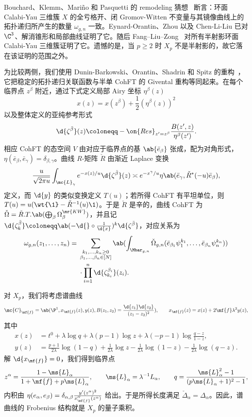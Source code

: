Bouchard、Klemm、Mari\~{n}o 和 Pasquetti 的 remodeling 猜想~\cite{BKMP2009} 断言：环面 Calabi-Yau 三维簇 \(X\) 的全亏格开、闭 Gromov-Witten 不变量与其镜像曲线上的拓扑递归所产生的数量 \(\omega_{g,n}\) 一致。Eynard-Orantin、Zhou 以及 Chen-Li-Liu 已对 \(\C^3\)、解消锥形和局部曲线证明了它。随后 Fang--Liu--Zong~\cite{FLZ2020} 对所有半射影环面 Calabi-Yau 三维簇证明了它。遗憾的是，当 \(p \geq 2\) 时 \(X_p\) 不是半射影的，故它落在该证明的范围之外。

为比较两侧，我们使用 Dunin-Barkowski、Orantin、Shadrin 和 Spitz 的重构~\cite{DOSS2014}，它把稳定的拓扑递归关联函数与半单 CohFT 的 Givental 重构等同起来。在每个临界点 \(z^{\beta}\) 附近，通过下式定义局部 Airy 坐标 \(\eta^{\beta}(z)\)
\[ x(z) = x(z^{\beta}) + \frac{1}{2}(\eta^{\beta}(z))^2 \]
以及整体定义的亚纯参考形式
\[ \d{\zeta^{\bar{\beta}}}(z) \coloneqq -\on{Res}_{z'=z^{\beta}}\frac{B(z',z)}{\eta^{\beta}(z')}. \]
相应 CohFT 的态空间 \(V\) 由对应于临界点的基 \(\ab\{\bar{e}_{\beta}\}\) 张成，配为对角形式，\(\eta(\bar{e}_{\beta},\bar{e}_{\gamma}) = \delta_{\beta,\gamma}\)。曲线 \(R\)-矩阵 \(\check{R}\) 由渐近 Laplace 变换
\[ \frac{u}{\sqrt{2\pi u}}\int_{\mc{L}_{\gamma}} e^{-x(z)/u}\d{\zeta^{\bar{\beta}}}(z) \asymp e^{-x^{\gamma}/u}\eta\ab(\bar{e}_{\gamma}, \check{R}^*(-u)\bar{e}_{\beta}), \]
定义，而 \(\d{y}\) 的类似变换定义 \(T(u)\)；若所得 CohFT 有平坦单位，则 \(T(u) = u(\wt{\1}-\check{R}^{-1}(u)\1)\)。于是 \(\check{R}\) 是辛的，曲线 CohFT 为 \(\check{\Omega} = \check{R}.T.\ab(\bigoplus_{\beta}\Omega^{\mr{KW}}_{\beta})\)，并且记 \(\d{\zeta^{\bar{\beta}}_k} \coloneqq \ab(-\d{} \circ \frac{1}{\d{x}})^k \d{\zeta^{\bar{\beta}}}\)，对应关系为
\begin{align*}
    \omega_{g,n}(z_1,\ldots,z_n) ={}& \sum_{\substack{k_1,\ldots,k_n \geq 0 \\ \beta_1,\ldots,\beta_n \in [N]}}\ab(\int_{\Mbar_{g,n}} \check{\Omega}_{g,n}(\bar{e}_{\beta_1}\psi_1^{k_1},\ldots,\bar{e}_{\beta_n}\psi_n^{k_n})) \\
    &\cdot \prod_{i=1}^n \d{\zeta^{\beta_i}_{k_i}}(z_i).
\end{align*}

对 \(X_p\)，我们将考虑谱曲线
\[ \mc{C}_{\mf{f}} = \ab(\P^1, x_{\mf{f}}(z), y(z), B(z_1,z_2) = \frac{\d{z_1}\d{z_2}}{(z_1-z_2)^2}), \qquad x_{\mf{f}}(z) = x(z) + 2\mf{f}\lambda^2 y(z), \]
其中
\begin{align*}
    x(z) &= t^0 + \lambda \log q + \lambda(p-1)\log z + \lambda(-p-1)\log\frac{q-z}{1-z}, \\
    y(z) &= \frac{p+1}{2\lambda}\log(1-q) + \frac{1}{2\lambda}\log z - \frac{1}{2\lambda}\log(1-z) - \frac{1}{2\lambda}\log(q-z).
\end{align*}
解 \(\d{x_{\mf{f}}} = 0\)，我们得到临界点
\[ z^{\alpha} = \frac{1-\ms{L}_{\alpha}}{1+\mf{f}+p\ms{L}_{\alpha}}, \qquad \ms{L}_{\alpha} = \lambda^{-1}L_{\alpha}, \qquad q = \frac{\ms{L}_{\alpha}^2-1}{(p\ms{L}_{\alpha}+1)^2-1}, \]
内积由 \(\eta(e_{\alpha},e_{\beta}) = \delta_{\alpha,\beta}\frac{y'(z^{\alpha})^2}{x''_{\mf{f}}(z^{\alpha})}\) 给出。于是所得长度满足 \(\check{\Delta}_{\alpha} = \Delta_{\alpha}\)。因此，谱曲线的 Frobenius 结构就是 \(X_p\) 的量子乘积。

